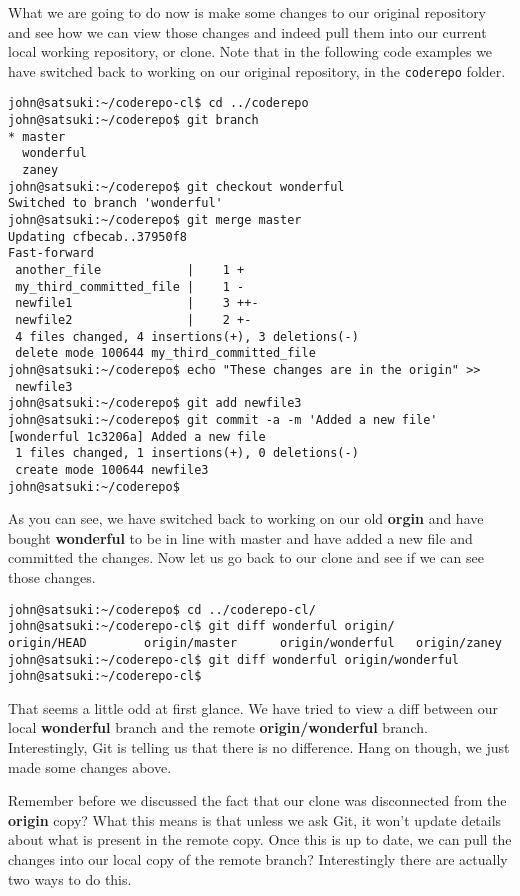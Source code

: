 What we are going to do now is make some changes to our original repository and see how we can view those changes and indeed pull them into our current local working repository, or clone.  Note that in the following code examples we have switched back to working on our original repository, in the \texttt{coderepo} folder.

\begin{Verbatim}
john@satsuki:~/coderepo-cl$ cd ../coderepo
john@satsuki:~/coderepo$ git branch
* master
  wonderful
  zaney
john@satsuki:~/coderepo$ git checkout wonderful 
Switched to branch 'wonderful'
john@satsuki:~/coderepo$ git merge master
Updating cfbecab..37950f8
Fast-forward
 another_file            |    1 +
 my_third_committed_file |    1 -
 newfile1                |    3 ++-
 newfile2                |    2 +-
 4 files changed, 4 insertions(+), 3 deletions(-)
 delete mode 100644 my_third_committed_file
john@satsuki:~/coderepo$ echo "These changes are in the origin" >> 
 newfile3
john@satsuki:~/coderepo$ git add newfile3
john@satsuki:~/coderepo$ git commit -a -m 'Added a new file'
[wonderful 1c3206a] Added a new file
 1 files changed, 1 insertions(+), 0 deletions(-)
 create mode 100644 newfile3
john@satsuki:~/coderepo$ 
\end{Verbatim}

As you can see, we have switched back to working on our old \textbf{orgin} and have bought \textbf{wonderful} to be in line with master and have added a new file and committed the changes.  Now let us go back to our clone and see if we can see those changes.

\begin{Verbatim}
john@satsuki:~/coderepo$ cd ../coderepo-cl/
john@satsuki:~/coderepo-cl$ git diff wonderful origin/
origin/HEAD        origin/master      origin/wonderful   origin/zaney 
john@satsuki:~/coderepo-cl$ git diff wonderful origin/wonderful 
john@satsuki:~/coderepo-cl$ 
\end{Verbatim}

That seems a little odd at first glance.  We have tried to view a diff between our local \textbf{wonderful} branch and the remote \textbf{origin/wonderful} branch.  Interestingly, Git is telling us that there is no difference.  Hang on though, we just made some changes above.  

Remember before we discussed the fact that our clone was disconnected from the \textbf{origin} copy?  What this means is that unless we ask Git, it won't update details about what is present in the remote copy.  Once this is up to date, we can pull the changes into our local copy of the remote branch?  Interestingly there are actually two ways to do this.

